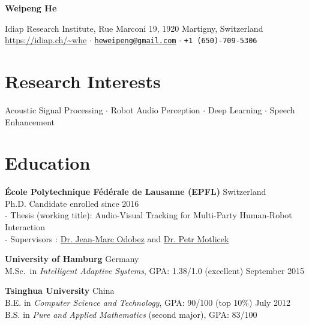 \documentclass[a4paper,10pt]{article} %
\newcommand{\ind}{\hspace*{1em}}
\begin{document}
\thispagestyle{empty}


\begin{center}
  {\Huge\bfseries\sffamily Weipeng He}

  \sffamily Idiap Research Institute, Rue Marconi 19, 1920 Martigny, Switzerland \\
  \url{https://idiap.ch/~whe} $\cdotp$
  \href{mailto:heweipeng@gmail.com}{\texttt{heweipeng@gmail.com}} $\cdotp$
  \texttt{+1 (650)-709-5306}
\end{center}


\section{Research Interests}
\begin{center}
Acoustic Signal Processing $\cdotp$ Robot Audio Perception $\cdotp$ Deep Learning $\cdotp$ Speech Enhancement
\end{center}


\section{Education}
\textbf{\'Ecole Polytechnique F\'ed\'erale de Lausanne (EPFL)} \hfill Switzerland \\
\ind Ph.D. Candidate \hfill enrolled since 2016 \\
\ind - Thesis (working title): Audio-Visual Tracking for Multi-Party Human-Robot Interaction \\
\ind - Supervisors : \href{https://idiap.ch/~odobez}{Dr. Jean-Marc Odobez} and \href{https://people.idiap.ch/pmotlic}{Dr. Petr Motlicek}

\textbf{University of Hamburg} \hfill Germany \\
\ind M.Sc.\ in \textit{Intelligent Adaptive Systems}, GPA\@: 1.38/1.0 (excellent)  \hfill September 2015

\textbf{Tsinghua University} \hfill China \\
\ind B.E. in \textit{Computer Science and Technology}, GPA\@: 90/100 (top 10\%) \hfill July 2012 \\
\ind B.S. in \textit{Pure and Applied Mathematics} (second major), GPA\@: 83/100 %
\end{document}
